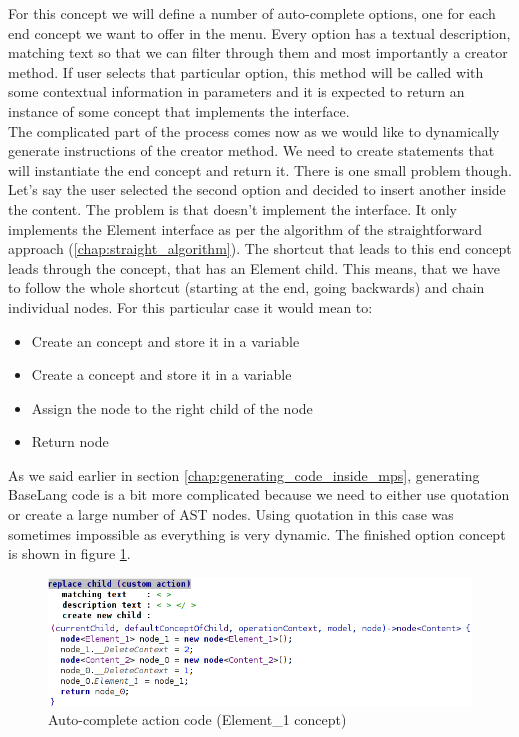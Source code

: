 For this concept we will define a number of auto-complete options, one for each end concept we want to offer in the menu. Every option has a textual description, matching text so that we can filter through them and most importantly a creator method. If user selects that particular option, this method will be called with some contextual information in parameters and it is expected to return an instance of some concept that implements the  interface.
\\

The complicated part of the process comes now as we would like to dynamically generate instructions of the creator method. We need to create statements that will instantiate the end concept and return it. There is one small problem though. Let's say the user selected the second option and decided to insert another  inside the content. The problem is that  doesn't implement the  interface. It only implements the Element interface as per the algorithm of the straightforward approach (\ref{chap:straight_algorithm}). The shortcut that leads to this end concept leads through the  concept, that has an Element child. This means, that we have to follow the whole shortcut (starting at the end, going backwards) and chain individual nodes. For this particular case it would mean to:

\begin{itemize}
	\item Create an  concept and store it in a variable
	
	\item Create a  concept and store it in a variable
	
	\item Assign the  node to the right child of the  node
	
	\item Return  node
\end{itemize}

As we said earlier in section \ref{chap:generating_code_inside_mps}, generating BaseLang code is a bit more complicated because we need to either use quotation or create a large number of AST nodes. Using quotation in this case was sometimes impossible as everything is very dynamic. The finished option concept is shown in figure \ref{fig:autocomplete_action}.

\begin{figure}[h]
	\centering
	\includegraphics[width=\textwidth]{../img/autocomplete_action.png}
	\caption{Auto-complete action code (Element{\_}1 concept)}
	\label{fig:autocomplete_action}
\end{figure}


